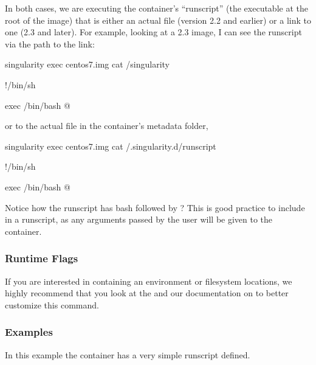 \documentclass[letterpaper,10pt,english]{sphinxmanual}
\begin{document}
In both cases, we are executing the container’s “runscript” (the
executable  at the root of the image) that is either an actual file
(version 2.2 and earlier) or a link to one (2.3 and later). For example,
looking at a 2.3 image, I can see the runscript via the path to the
link:

%
\begin{sphinxVerbatim}[commandchars=\\\{\}]
\PYGZdl{} singularity exec centos7.img cat /singularity

\PYGZsh{}!/bin/sh


exec /bin/bash \PYGZdq{}\PYGZdl{}@\PYGZdq{}
\end{sphinxVerbatim}

or to the actual file in the container’s metadata folder, 

%
\begin{sphinxVerbatim}[commandchars=\\\{\}]
\PYGZdl{} singularity exec centos7.img cat /.singularity.d/runscript

\PYGZsh{}!/bin/sh


exec /bin/bash \PYGZdq{}\PYGZdl{}@\PYGZdq{}
\end{sphinxVerbatim}

Notice how the runscript has bash followed by  ? This is good practice
to include in a runscript, as any arguments passed by the user will be
given to the container.


\subsubsection{Runtime Flags}
\label{\detokenize{appendix:id35}}
If you are interested in containing an environment or filesystem
locations, we highly recommend that you look at the  and our
documentation on 
to better customize this command.


\subsubsection{Examples}
\label{\detokenize{appendix:id37}}
In this example the container has a very simple runscript defined.
\end{document}
